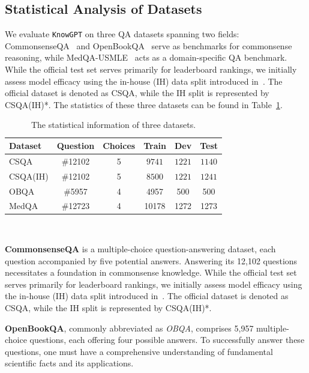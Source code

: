 \documentclass{article}
\theoremstyle{boldremark}
\begin{document}
\subsection{Statistical Analysis of Datasets}
We evaluate \texttt{KnowGPT} on three QA datasets spanning two fields: CommonsenseQA~\cite{CommonsenseQA} and OpenBookQA~\cite{mihaylov2018can} serve as benchmarks for commonsense reasoning, while MedQA-USMLE~\cite{app11146421} acts as a domain-specific QA benchmark.  While the official test set serves primarily for leaderboard rankings, we initially assess model efficacy using the in-house (IH) data split introduced in~\cite{KagNet}.  The official dataset is denoted as CSQA, while the IH split is represented by CSQA(IH)*. The statistics of these three datasets can be found in Table~\ref{tab:DatasetStatistics}.

\begin{table}[!ht]\small
  \caption{The statistical information of three datasets.}
  \label{tab:DatasetStatistics}
\centering
\setlength{\tabcolsep}{2.5mm}
\begin{tabular}{lccccc}
\toprule
     Dataset &Question &Choices &Train  &Dev   &Test \\ \midrule
CSQA & \#12102 & 5 & $9741$    & $1221$  & $1140$     \\ 
CSQA(IH) & \#12102 & 5 & $8500$    & $1221$  & $1241$ \\
OBQA  & \#5957 & 4 & 4957 &500   & 500   \\
MedQA &\#12723 &4 &10178 &1272 &1273 
\\ \bottomrule
\end{tabular}\\

\end{table}

\noindent \textbf{CommonsenseQA} is a multiple-choice question-answering dataset, each question accompanied by five potential answers. Answering its 12,102 questions necessitates a foundation in commonsense knowledge. While the official test set serves primarily for leaderboard rankings, we initially assess model efficacy using the in-house (IH) data split introduced in~\cite{KagNet}.  The official dataset is denoted as CSQA, while the IH split is represented by CSQA(IH)*.


\noindent \textbf{OpenBookQA}, commonly abbreviated as \textit{OBQA}, comprises 5,957 multiple-choice questions, each offering four possible answers. To successfully answer these questions, one must have a comprehensive understanding of fundamental scientific facts and its applications. 
\end{document}
